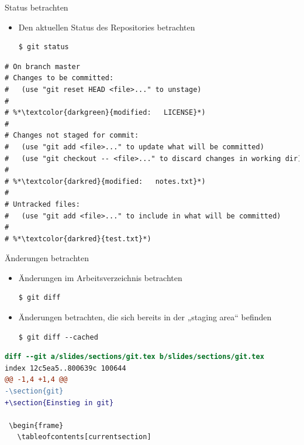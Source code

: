 \begin{frame}[fragile]{Status betrachten}
  \begin{itemize}
    \item Den aktuellen Status des Repositories betrachten
    \begin{lstlisting}
$ git status
    \end{lstlisting}
  \end{itemize}
  \begin{lstlisting}[language=diff,frame=single,caption={Ausgabe von git status}]
# On branch master
# Changes to be committed:
#   (use "git reset HEAD <file>..." to unstage)
#
# %*\textcolor{darkgreen}{modified:   LICENSE}*)
#
# Changes not staged for commit:
#   (use "git add <file>..." to update what will be committed)
#   (use "git checkout -- <file>..." to discard changes in working dir)
#
# %*\textcolor{darkred}{modified:   notes.txt}*)
#
# Untracked files:
#   (use "git add <file>..." to include in what will be committed)
#
# %*\textcolor{darkred}{test.txt}*)
  \end{lstlisting}
\end{frame}

\begin{frame}[fragile]{Änderungen betrachten}
  \begin{itemize}
    \item Änderungen im Arbeitsverzeichnis betrachten
    \begin{lstlisting}
$ git diff
    \end{lstlisting}
    \item Änderungen betrachten, die sich bereits in der „staging area“ befinden
    \begin{lstlisting}
$ git diff --cached
    \end{lstlisting}
  \end{itemize}
  \begin{lstlisting}[frame=single, caption=Ausgabe von git diff,language=diff]
diff --git a/slides/sections/git.tex b/slides/sections/git.tex
index 12c5ea5..800639c 100644
@@ -1,4 +1,4 @@
-\section{git}
+\section{Einstieg in git}
 
 \begin{frame}
   \tableofcontents[currentsection]
  \end{lstlisting}
\end{frame}

